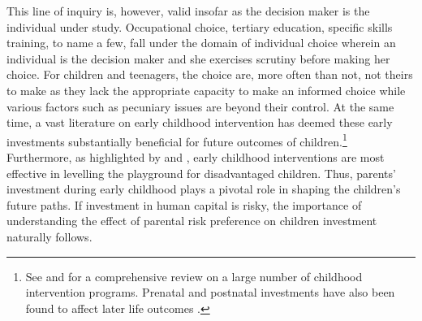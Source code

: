 \documentclass[emulatestandardclasses, 10pt, abstract = true]{scrartcl}
\begin{document}
This line of inquiry is, however, valid insofar as the decision maker is the individual under study. Occupational choice, tertiary education, specific skills training, to name a few, fall under the domain of individual choice wherein an individual is the decision maker and she exercises scrutiny before making her choice. For children and teenagers, the choice are, more often than not, not theirs to make as they lack the appropriate capacity to make an informed choice while various factors such as pecuniary issues are beyond their control. At the same  time, a vast literature on early childhood intervention has deemed these early investments substantially beneficial for future outcomes of children.\footnote{See \citet{Currie2001} and \citet{NORES2010} for a comprehensive review on a large number of childhood intervention programs. Prenatal and postnatal investments have also been found to affect later life outcomes \citep{currie2011human, almond2011killing, currie2013early}.} Furthermore, as highlighted by \citet{jacob2008improving} and \citet{duflo2011poor}, early childhood interventions are most effective in levelling the playground for disadvantaged children. Thus, parents' investment during early childhood plays a pivotal role in shaping the children's future paths. If investment in human capital is risky, the importance of understanding the effect of parental risk preference on children investment naturally follows. 
    
\end{document}
